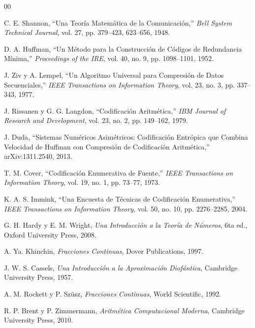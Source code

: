 \documentclass[onecolumn]{IEEEtran}
\begin{document}

\begin{thebibliography}{00}

C. E. Shannon,
``Una Teoría Matemática de la Comunicación,''
\emph{Bell System Technical Journal},
vol. 27,
pp. 379--423, 623--656,
1948.

D. A. Huffman,
``Un Método para la Construcción de Códigos de Redundancia Mínima,''
\emph{Proceedings of the IRE},
vol. 40,
no. 9,
pp. 1098--1101,
1952.

J. Ziv y A. Lempel,
``Un Algoritmo Universal para Compresión de Datos Secuenciales,''
\emph{IEEE Transactions on Information Theory},
vol. 23,
no. 3,
pp. 337--343,
1977.

J. Rissanen y G. G. Langdon,
``Codificación Aritmética,''
\emph{IBM Journal of Research and Development},
vol. 23,
no. 2,
pp. 149--162,
1979.

J. Duda,
``Sistemas Numéricos Asimétricos: Codificación Entrópica que Combina
Velocidad de Huffman con Compresión de Codificación Aritmética,''
arXiv:1311.2540,
2013.

T. M. Cover,
``Codificación Enumerativa de Fuente,''
\emph{IEEE Transactions on Information Theory},
vol. 19,
no. 1,
pp. 73--77,
1973.

K. A. S. Immink,
``Una Encuesta de Técnicas de Codificación Enumerativa,''
\emph{IEEE Transactions on Information Theory},
vol. 50,
no. 10,
pp. 2276--2285,
2004.

G. H. Hardy y E. M. Wright,
\emph{Una Introducción a la Teoría de Números},
6ta ed.,
Oxford University Press,
2008.

A. Ya. Khinchin,
\emph{Fracciones Continuas},
Dover Publications,
1997.

J. W. S. Cassels,
\emph{Una Introducción a la Aproximación Diofántica},
Cambridge University Press,
1957.

A. M. Rockett y P. Sz\"usz,
\emph{Fracciones Continuas},
World Scientific,
1992.

R. P. Brent y P. Zimmermann,
\emph{Aritmética Computacional Moderna},
Cambridge University Press,
2010.

\end{thebibliography}
\end{document}
